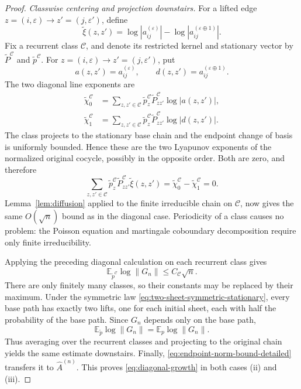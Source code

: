 \documentclass[11pt,a4paper]{amsart}
\theoremstyle{definition}
\theoremstyle{remark}
\numberwithin{equation}{section}
\newcommand{\EE}{\mathbb E}
\newcommand{\1}{\boldsymbol 1}
\begin{document}
\begin{proof}
\medskip
\noindent
\emph{Classwise centering and projection downstairs.}
For a lifted edge
$z=(i,\varepsilon)\to z'=(j,\varepsilon')$, define
\begin{equation}\label{eq:two-sheet-ratio-observable}
 \widetilde\xi(z,z')
 =\log|a_{ij}^{(\varepsilon)}|
  -\log|a_{ij}^{(\varepsilon\oplus1)}|.
\end{equation}
Fix a recurrent class $\mathcal C$, and denote its restricted kernel
and stationary vector by
$\widetilde P^{\mathcal C}$ and
$\widetilde p^{\mathcal C}$.  For
$z=(i,\varepsilon)\to z'=(j,\varepsilon')$, put
$$
 a(z,z')=a_{ij}^{(\varepsilon)},
 \qquad
 d(z,z')=a_{ij}^{(\varepsilon\oplus1)}.
$$
The two diagonal line exponents are
\begin{align*}
 \widetilde\chi_0^{\mathcal C}
 &=\sum_{z,z'\in\mathcal C}
   \widetilde p_z^{\mathcal C}
   \widetilde P_{zz'}^{\mathcal C}
   \log|a(z,z')|,\\
 \widetilde\chi_1^{\mathcal C}
 &=\sum_{z,z'\in\mathcal C}
   \widetilde p_z^{\mathcal C}
   \widetilde P_{zz'}^{\mathcal C}
   \log|d(z,z')|.
\end{align*}
The class projects to the stationary base chain and the endpoint change
of basis is uniformly bounded.  Hence these are the two Lyapunov
exponents of the normalized original cocycle, possibly in the opposite
order.  Both are zero, and therefore
\begin{equation}\label{eq:two-sheet-centered}
 \sum_{z,z'\in\mathcal C}
 \widetilde p_z^{\mathcal C}
 \widetilde P_{zz'}^{\mathcal C}
 \widetilde\xi(z,z')
 =\widetilde\chi_0^{\mathcal C}
  -\widetilde\chi_1^{\mathcal C}=0.
\end{equation}
Lemma~\eqref{lem:diffusion} applied to the finite irreducible chain on $\mathcal C$, now gives the same $O(\sqrt n)$ bound as in the diagonal case.  Periodicity of a class causes no problem: the Poisson equation and martingale coboundary decomposition require only finite irreducibility.

Applying the preceding diagonal calculation on each recurrent class
gives
$$
 \EE_{\widetilde p^{\mathcal C}}
 \log\|G_n\|\le C_{\mathcal C}\sqrt n.
$$
There are only finitely many classes, so their constants may be
replaced by their maximum.  Under the symmetric law
\eqref{eq:two-sheet-symmetric-stationary}, every base path has exactly
two lifts, one for each initial sheet, each with half the probability
of the base path.  Since $G_n$ depends only on the base path,
\begin{equation}\label{eq:two-sheet-projection-expectation}
 \EE_{\widetilde p}\log\|G_n\|
 =\EE_p\log\|G_n\|.
\end{equation}
Thus averaging over the recurrent classes and projecting to the
original chain yields the same estimate downstairs.
Finally, \eqref{eq:endpoint-norm-bound-detailed} transfers it to
$\widehat A^{(n)}$.  This proves \eqref{eq:diagonal-growth} in both
cases (ii) and (iii).

\end{proof}
\end{document}
